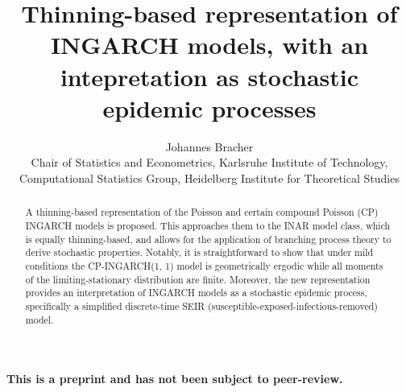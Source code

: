 \documentclass{article}
\begin{document}
\title{Thinning-based representation of INGARCH models, with an intepretation as stochastic epidemic processes}
\author{Johannes Bracher\\
Chair of Statistics and Econometrics, Karlsruhe Institute of Technology, \\ %
Computational Statistics Group, Heidelberg Institute for Theoretical Studies}


\newcommand{\juv}{E}

\maketitle


\begin{abstract}
A thinning-based representation of the Poisson and certain compound Poisson (CP) INGARCH models is proposed. This approaches them to the INAR model class, which is equally thinning-based, and allows for the application of branching process theory to derive stochastic properties. Notably, it is straightforward to show that under mild conditions the CP-INGARCH(1, 1) model is geometrically ergodic while all moments of the limiting-stationary distribution are finite. Moreover, the new representation provides an interpretation of INGARCH models as a stochastic epidemic process, specifically a simplified discrete-time SEIR (susceptible-exposed-infectious-removed) model.
\end{abstract}

\bigskip

\begin{center}
\textbf{This is a preprint and has not been subject to peer-review.}
\end{center}


\maketitle
\end{document}
